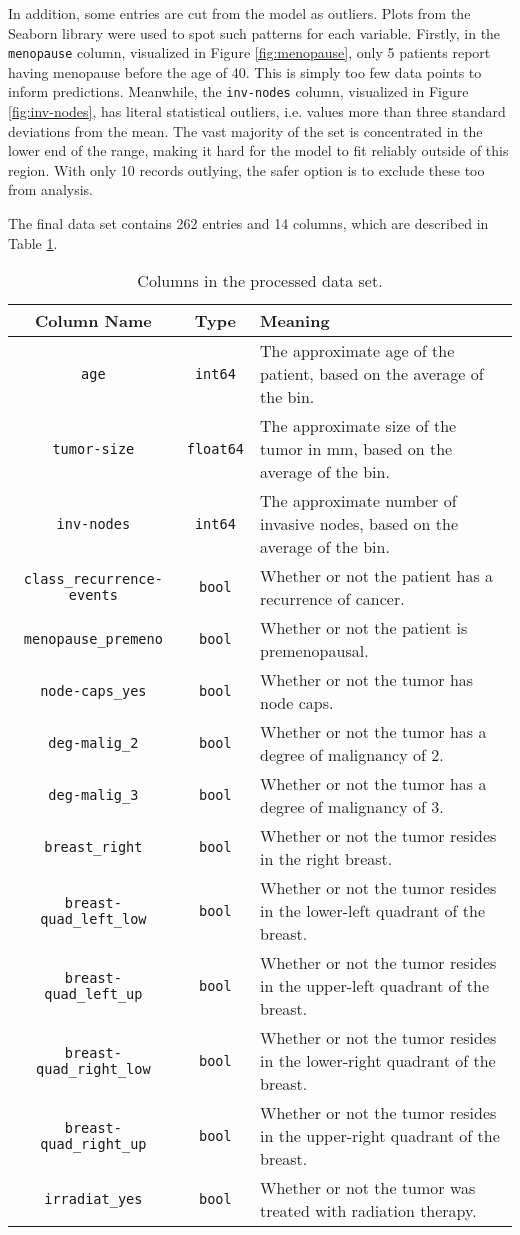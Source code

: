 \documentclass{article}
\begin{document}
In addition, some entries are cut from the model as outliers. Plots from the Seaborn library were used to spot such patterns for each variable. Firstly, in the \verb|menopause| column, visualized in Figure \ref{fig:menopause}, only 5 patients report having menopause before the age of 40. This is simply too few data points to inform predictions. Meanwhile, the \verb|inv-nodes| column, visualized in Figure \ref{fig:inv-nodes}, has literal statistical outliers, i.e. values more than three standard deviations from the mean. The vast majority of the set is concentrated in the lower end of the range, making it hard for the model to fit reliably outside of this region. With only 10 records outlying, the safer option is to exclude these too from analysis.

The final data set contains 262 entries and 14 columns, which are described in Table \ref{tbl:cols2}.

\begin{table}
	\centering
	\caption{Columns in the processed data set.}
	\label{tbl:cols2}
	\begin{tabular}{cc|p{3.5in}}
		Column Name & Type & Meaning \\
		\hline
		\verb|age| & \verb|int64| & The approximate age of the patient, based on the average of the bin. \\
		\verb|tumor-size| & \verb|float64| & The approximate size of the tumor in mm, based on the average of the bin. \\
		\verb|inv-nodes| & \verb|int64| & The approximate number of invasive nodes, based on the average of the bin. \\
		\verb|class_recurrence-events| & \verb|bool| & Whether or not the patient has a recurrence of cancer. \\
		\verb|menopause_premeno| & \verb|bool| & Whether or not the patient is premenopausal. \\
		\verb|node-caps_yes| & \verb|bool| & Whether or not the tumor has node caps. \\
		\verb|deg-malig_2| & \verb|bool| & Whether or not the tumor has a degree of malignancy of 2. \\
		\verb|deg-malig_3| & \verb|bool| & Whether or not the tumor has a degree of malignancy of 3. \\
		\verb|breast_right| & \verb|bool| & Whether or not the tumor resides in the right breast. \\
		\verb|breast-quad_left_low| & \verb|bool| & Whether or not the tumor resides in the lower-left quadrant of the breast. \\
		\verb|breast-quad_left_up| & \verb|bool| & Whether or not the tumor resides in the upper-left quadrant of the breast. \\
		\verb|breast-quad_right_low| & \verb|bool| & Whether or not the tumor resides in the lower-right quadrant of the breast. \\
		\verb|breast-quad_right_up| & \verb|bool| & Whether or not the tumor resides in the upper-right quadrant of the breast. \\
		\verb|irradiat_yes| & \verb|bool| & Whether or not the tumor was treated with radiation therapy.
	\end{tabular}
\end{table}
\end{document}
